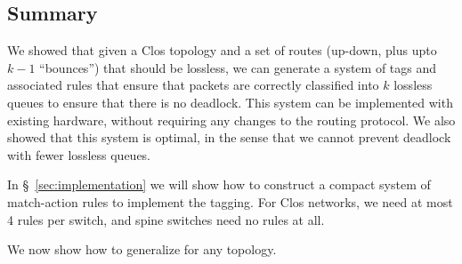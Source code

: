 \subsection {Summary}

We showed that given a Clos topology and a set of routes (up-down, plus
upto $k-1$ ``bounces'') that should be lossless, we can generate a system of
tags and associated rules that ensure that packets are correctly classified
into $k$ lossless queues to ensure that there is no deadlock.   This system can
be implemented with existing hardware, without requiring any changes to the
routing protocol. We also showed that this system is optimal, in the sense that
we cannot prevent deadlock with fewer lossless queues.

In  \S~\ref{sec:implementation} we will show how to construct a compact system of
match-action rules to implement the tagging. For Clos networks, we need at 
most 4 rules per switch, and spine switches need no rules at all.

We now show how to generalize \sysname{} for any topology.
